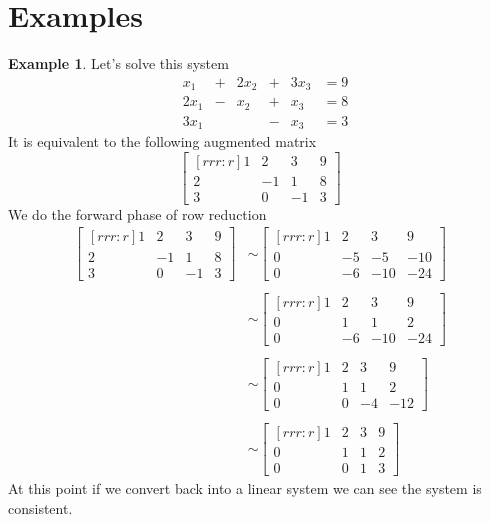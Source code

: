 \documentclass[12pt,letterpaper]{article}
\newcommand{\0}{{\bf 0}}
\theoremstyle{plain}
\theoremstyle{definition}
\newtheorem{example}{Example}
\begin{document}
\section{Examples}
\begin{example}
Let's solve this system 
\[
\begin{array}{lrcrcrl}
&x_1& +&2x_2&+&3x_3&=9\\
 &2x_1& -  &x_2&+&x_3&=8\\
&3x_1& \ &\ & -&x_3&=3
\end{array}
\]
It is equivalent to the following augmented matrix 
\[\begin{bmatrix}[rrr:r]
1& 2 & 3 &9\\
2& -1 & 1&8\\
3 & 0 & -1 &3
\end{bmatrix} \]
We do the forward phase of row reduction 
\begin{align*}
\begin{bmatrix}[rrr:r]
1& 2 & 3 &9\\
2& -1 & 1&8\\
3 & 0 & -1 &3
\end{bmatrix}
&\sim \begin{bmatrix}[rrr:r]
1& 2 & 3 &9\\
0& -5 & -5&-10\\
0 & -6 & -10 &-24
\end{bmatrix}\\
\ \\
&\sim \begin{bmatrix}[rrr:r]
1& 2 & 3 &9\\
0& 1& 1&2\\
0 & -6 & -10 &-24
\end{bmatrix}
\\
\ \\
&\sim\begin{bmatrix}[rrr:r]
1& 2 & 3 &9\\
0& 1& 1&2\\
0 & 0 & -4 &-12
\end{bmatrix}\\
\ \\
&\sim\begin{bmatrix}[rrr:r]
1& 2 & 3 &9\\
0& 1& 1&2\\
0 & 0 & 1 &3
\end{bmatrix}
\end{align*}
At this point if we convert back into a linear system we can see the system is consistent. 
\[
\begin{array}{lrcrcrl}

\end{array}\]
\end{example}
\end{document}
